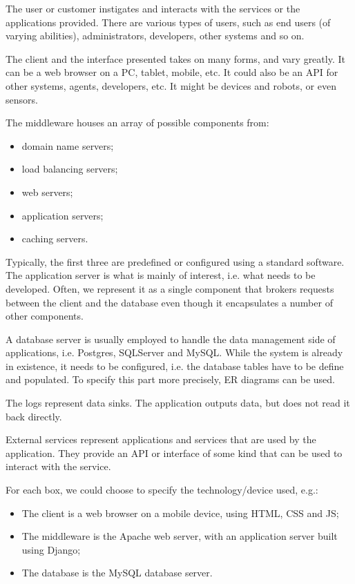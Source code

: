 \documentclass[a4paper, openany]{memoir}
\begin{document}
The user or customer instigates and interacts with the services or the applications provided. There are various types of users, such as end users (of varying abilities), administrators, developers, other systems and so on.

The client and the interface presented takes on many forms, and vary greatly. It can be a web browser on a PC, tablet, mobile, etc. It could also be an API for other systems, agents, developers, etc. It might be devices and robots, or even sensors.

The middleware houses an array of possible components from:
\begin{itemize}
    \item domain name servers;
    \item load balancing servers;
    \item web servers;
    \item application servers;
    \item caching servers.
\end{itemize}
Typically, the first three are predefined or configured using a standard software. The application server is what is mainly of interest, i.e. what needs to be developed. Often, we represent it as a single component that brokers requests between the client and the database even though it encapsulates a number of other components.

A database server is usually employed to handle the data management side of applications, i.e. Postgres, SQLServer and MySQL. While the system is already in existence, it needs to be configured, i.e. the database tables have to be define and populated. To specify this part more precisely, ER diagrams can be used.

The logs represent data sinks. The application outputs data, but does not read it back directly. 

External services represent applications and services that are used by the application. They provide an API or interface of some kind that can be used to interact with the service.

For each box, we could choose to specify the technology/device used, e.g.:
\begin{itemize}
    \item The client is a web browser on a mobile device, using HTML, CSS and JS;
    \item The middleware is the Apache web server, with an application server built using Django;
    \item The database is the MySQL database server.
\end{itemize}
\end{document}
